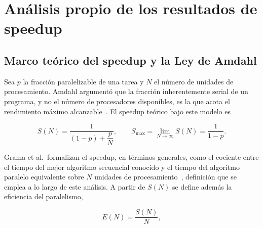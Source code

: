 \documentclass[11pt,a4paper]{article}
\begin{document}
    \section{Análisis propio de los resultados de speedup}
    \label{sec:analisis-speedup}

    \subsection{Marco teórico del speedup y la Ley de Amdahl}

    Sea $p$ la fracción paralelizable de una tarea y $N$ el número de
    unidades de procesamiento. Amdahl argumentó que la fracción
    inherentemente serial de un programa, y no el número de procesadores
    disponibles, es la que acota el rendimiento máximo
    alcanzable~\cite{amdahl1967}. El speedup teórico bajo este modelo es

    \begin{equation}
        S(N) = \frac{1}{(1-p) + \dfrac{p}{N}},
        \qquad
        S_{\max} = \lim_{N \to \infty} S(N) = \frac{1}{1-p}.
        \label{eq:amdahl}
    \end{equation}

    Grama et al.\ formalizan el speedup, en términos generales, como el
    cociente entre el tiempo del mejor algoritmo secuencial conocido y el
    tiempo del algoritmo paralelo equivalente sobre $N$ unidades de
    procesamiento~\cite{grama2003}, definición que se emplea a lo largo de
    este análisis. A partir de $S(N)$ se define además la eficiencia del
    paralelismo,

    \begin{equation}
        E(N) = \frac{S(N)}{N},
        \label{eq:eficiencia}
    \end{equation}
\end{document}
